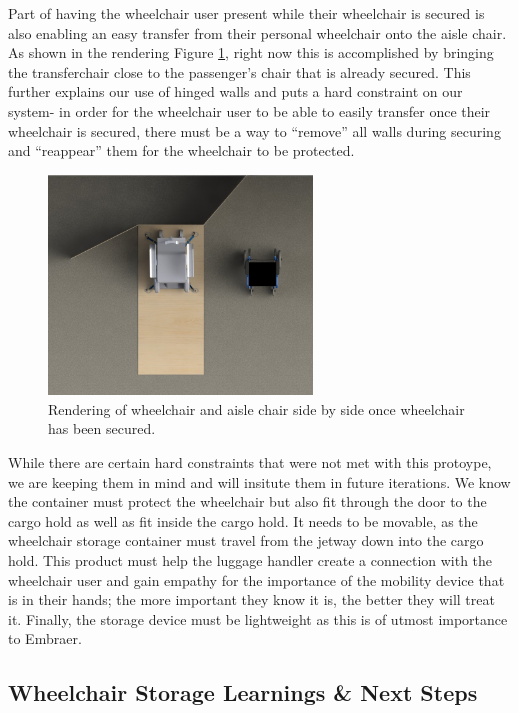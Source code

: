 Part of having the wheelchair user present while their wheelchair is secured is also enabling an easy transfer from their personal wheelchair onto the aisle chair. As shown in the rendering  Figure \ref{fig:storagetransfer.png}, right now this is accomplished by bringing the transferchair close to the passenger's chair that is already secured. This further explains our use of hinged walls and puts a hard constraint on our system- in order for the wheelchair user to be able to easily transfer once their wheelchair is secured, there must be a way to ``remove'' all walls during securing and ``reappear'' them for the wheelchair to be protected.

\begin{figure}[h]
  \centering
     \includegraphics[width=7cm]{images/storagetransfer.png}
   \caption{Rendering of wheelchair and aisle chair side by side once wheelchair has been secured.}
  \label{fig:storagetransfer.png}
\end{figure}

While there are certain hard constraints that were not met with this protoype, we are keeping them in mind and will insitute them in future iterations. We know the container must protect the wheelchair but also fit through the door to the cargo hold as well as fit inside the cargo hold. It needs to be movable, as the wheelchair storage container must travel from the jetway down into the cargo hold. This product must help the luggage handler create a connection with the wheelchair user and gain empathy for the importance of the mobility device that is in their hands; the more important they know it is, the better they will treat it. Finally, the storage device must be lightweight as this is of utmost importance to Embraer.

\subsection{Wheelchair Storage Learnings \& Next Steps}

